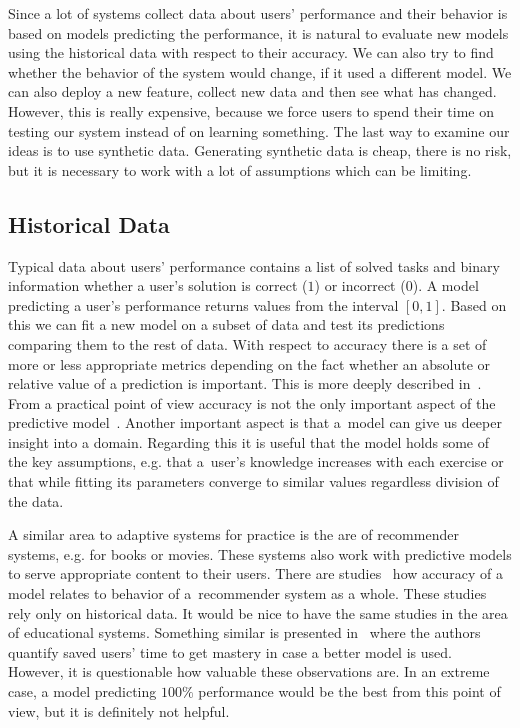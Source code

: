 \documentclass[table,color,cover,twoside,nolot,nolof]{fithesis3/fithesis3}
\begin{document}
Since a lot of systems collect data about users' performance and their
behavior is based on models predicting the performance, it is natural to
evaluate new models using the historical data with respect to their accuracy.
We can also try to find whether the behavior of the system would change, if it
used a different model. We can also deploy a new feature, collect new data and then
see what has changed. However, this is really expensive, because we
force users to spend their time on testing our system instead of on learning
something. The last way to examine our ideas is to use synthetic data.
Generating synthetic data is cheap, there is no risk, but it is necessary to
work with a lot of assumptions which can be limiting.

\subsection{Historical Data}

Typical data about users' performance contains a list of solved tasks and
binary information whether a user's solution is correct ($1$) or incorrect
($0$). A model predicting a user's performance returns values from the interval
$[0, 1]$. Based on this we can fit a new model on a subset of data and test its
predictions comparing them to the rest of data. With respect to accuracy there
is a set of more or less appropriate metrics depending on the fact whether an
absolute or relative value of a prediction is important. This is more deeply
described in~\cite{pelanek2014brief}. From a practical point of view
accuracy is not the only important aspect of the predictive
model~\cite{huang2015framework}. Another important aspect is that a~model can
give us deeper insight into a domain. Regarding this it is useful that the
model holds some of the key assumptions, e.g. that a~user's knowledge increases with
each exercise or that while fitting its parameters converge to similar values
regardless division of the data.

A similar area to adaptive systems for practice is the are of recommender
systems, e.g. for books or movies. These systems also work with predictive
models to serve appropriate content to their users. There are
studies~\cite{cremonesi2010performance} how accuracy of a model relates to
behavior of a~recommender system as a whole. These studies rely only on
historical data. It would be nice to have the same studies in the area of
educational systems. Something similar is presented
in~\cite{yudelson2015small} where the authors quantify saved users' time to get
mastery in case a better model is used. However, it is questionable how valuable
these observations are. In an extreme case, a model predicting $100\%$
performance would be the best from this point of view, but it is definitely not
helpful.
\end{document}
